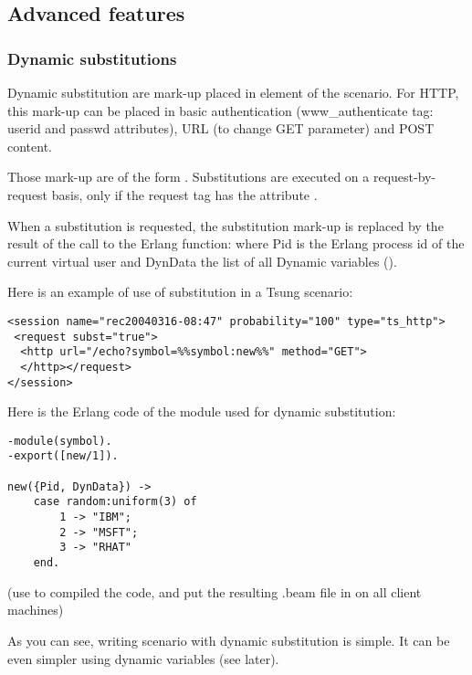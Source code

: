 \documentclass{TSUNG-en}
\begin{document}
\subsection{Advanced features}

\subsubsection{Dynamic substitutions}

 Dynamic substitution are mark-up placed in element of the scenario.
For HTTP, this mark-up can be placed in basic authentication (www\_authenticate
tag: userid and passwd attributes), URL (to change GET parameter)
and POST content.

Those mark-up are of the form .
Substitutions are executed on a request-by-request basis, only if the
request tag has the attribute .

When a substitution is requested, the substitution mark-up is replaced by
the result of the call to the Erlang function:
 where Pid is the Erlang process
id of the current virtual user and DynData the list of all Dynamic
variables ().

Here is an example of use of substitution in a Tsung scenario:

\begin{Verbatim}
<session name="rec20040316-08:47" probability="100" type="ts_http">
 <request subst="true">
  <http url="/echo?symbol=%%symbol:new%%" method="GET">
  </http></request>
</session>
\end{Verbatim}

Here is the Erlang code of the module used for dynamic substitution:

\begin{Verbatim}
-module(symbol).
-export([new/1]).

new({Pid, DynData}) ->
    case random:uniform(3) of
        1 -> "IBM";
        2 -> "MSFT";
        3 -> "RHAT"
    end.
\end{Verbatim}

(use  to compiled the code, and put the resulting .beam
file in  on all client
machines)

As you can see, writing scenario with dynamic substitution is
simple. It can be even simpler using dynamic variables (see later).
\end{document}
